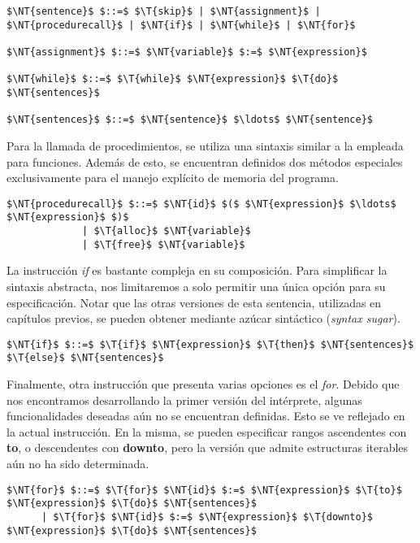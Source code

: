 \begin{lstlisting}[style = syntax]
$\NT{sentence}$ $::=$ $\T{skip}$ | $\NT{assignment}$ | $\NT{procedurecall}$ | $\NT{if}$ | $\NT{while}$ | $\NT{for}$

$\NT{assignment}$ $::=$ $\NT{variable}$ $:=$ $\NT{expression}$

$\NT{while}$ $::=$ $\T{while}$ $\NT{expression}$ $\T{do}$ $\NT{sentences}$

$\NT{sentences}$ $::=$ $\NT{sentence}$ $\ldots$ $\NT{sentence}$
\end{lstlisting}

Para la llamada de procedimientos, se utiliza una sintaxis similar a la empleada para funciones.
Además de esto, se encuentran definidos dos métodos especiales exclusivamente para el manejo explícito de memoria del programa.

\begin{lstlisting}[style = syntax]
$\NT{procedurecall}$ $::=$ $\NT{id}$ $($ $\NT{expression}$ $\ldots$ $\NT{expression}$ $)$
             | $\T{alloc}$ $\NT{variable}$
             | $\T{free}$ $\NT{variable}$
\end{lstlisting}

La instrucción \textit{if} es bastante compleja en su composición.
Para simplificar la sintaxis abstracta, nos limitaremos a solo permitir una única opción para su especificación.
Notar que las otras versiones de esta sentencia, utilizadas en capítulos previos, se pueden obtener mediante azúcar sintáctico (\textit{syntax sugar}).

\begin{lstlisting}[style = syntax]
$\NT{if}$ $::=$ $\T{if}$ $\NT{expression}$ $\T{then}$ $\NT{sentences}$ $\T{else}$ $\NT{sentences}$
\end{lstlisting}

Finalmente, otra instrucción que presenta varias opciones es el \textit{for}.
Debido que nos encontramos desarrollando la primer versión del intérprete, algunas funcionalidades deseadas aún no se encuentran definidas.
Esto se ve reflejado en la actual instrucción.
En la misma, se pueden especificar rangos ascendentes con \textbf{to}, o descendentes con \textbf{downto}, pero la versión que admite estructuras iterables aún no ha sido determinada.

\begin{lstlisting}[style = syntax]
$\NT{for}$ $::=$ $\T{for}$ $\NT{id}$ $:=$ $\NT{expression}$ $\T{to}$ $\NT{expression}$ $\T{do}$ $\NT{sentences}$
      | $\T{for}$ $\NT{id}$ $:=$ $\NT{expression}$ $\T{downto}$ $\NT{expression}$ $\T{do}$ $\NT{sentences}$
\end{lstlisting}

